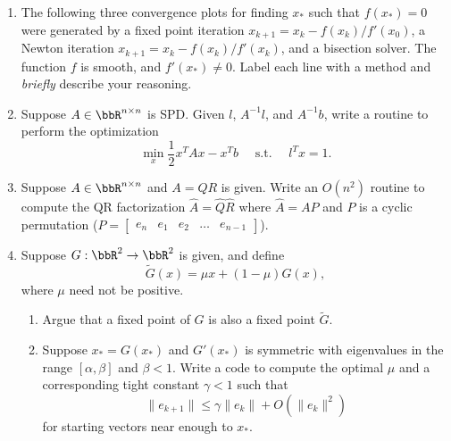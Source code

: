 \documentclass[12pt, leqno]{article}
\begin{document}
\begin{enumerate}
\item
  The following three convergence plots for finding $x_*$ such that
  $f(x_*) = 0$ were generated by a fixed point iteration
  $x_{k+1} = x_k - f(x_k)/f'(x_0)$, a Newton iteration
  $x_{k+1} = x_k - f(x_k)/f'(x_k)$, and a bisection solver.
  The function $f$ is smooth, and $f'(x_*) \neq 0$.
  Label each line with a method and {\em briefly} describe your
  reasoning.
  \begin{center}
  \end{center}

\item
  Suppose $A \in \bbR^{n \times n}$ is SPD.  Given $l$, $A^{-1} l$,
  and $A^{-1} b$, write a routine to perform the optimization
  \[
    \min_{x} \frac{1}{2} x^T A x - x^T b \quad \mbox{ s.t. } \quad l^Tx = 1.
  \]

\item
  Suppose $A \in \bbR^{n \times n}$ and $A = QR$ is given.  Write an
  $O(n^2)$ routine to compute the QR factorization $\hat{A} = \hat{Q}
  \hat{R}$ where $\hat{A} = AP$ and $P$ is a cyclic permutation
  ($P = \begin{bmatrix} e_n & e_1 & e_2 & \ldots & e_{n-1} \end{bmatrix}$).

\item
  Suppose $G : \bbR^2 \rightarrow \bbR^2$ is given, and define
  \[
    \tilde{G}(x) = \mu x + (1-\mu) G(x),
  \]
  where $\mu$ need not be positive.
  \begin{enumerate}
  \item Argue that a fixed point of $G$ is also a fixed point
    $\tilde{G}$.
  \item Suppose $x_* = G(x_*)$ and $G'(x_*)$ is symmetric with eigenvalues
    in the range $[\alpha, \beta]$ and $\beta < 1$.  Write a code to
    compute the optimal $\mu$ and a corresponding tight constant
    $\gamma < 1$ such that
    \[
      \|e_{k+1}\| \leq \gamma \|e_k\| + O(\|e_k\|^2)
    \]
    for starting vectors near enough to $x_*$.
  \end{enumerate}


\end{enumerate}
\end{document}
